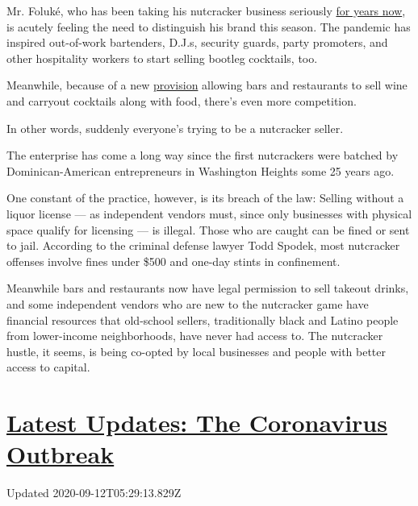 Mr. Foluké, who has been taking his nutcracker business seriously
\href{https://www.nytimes3xbfgragh.onion/2019/08/17/nyregion/banned-on-the-beach-its-still-nutcracker-summer.html}{for
years now}, is acutely feeling the need to distinguish his brand this
season. The pandemic has inspired out-of-work bartenders, D.J.s,
security guards, party promoters, and other hospitality workers to start
selling bootleg cocktails, too.

Meanwhile, because of a new
\href{https://sla.ny.gov/Restrictions-in-Response-to-COVID-19}{provision}
allowing bars and restaurants to sell wine and carryout cocktails along
with food, there's even more competition.

In other words, suddenly everyone's trying to be a nutcracker seller.

The enterprise has come a long way since the first nutcrackers were
batched by Dominican-American entrepreneurs in Washington Heights some
25 years ago.

One constant of the practice, however, is its breach of the law: Selling
without a liquor license --- as independent vendors must, since only
businesses with physical space qualify for licensing --- is illegal.
Those who are caught can be fined or sent to jail. According to the
criminal defense lawyer Todd Spodek, most nutcracker offenses involve
fines under \$500 and one-day stints in confinement.

Meanwhile bars and restaurants now have legal permission to sell takeout
drinks, and some independent vendors who are new to the nutcracker game
have financial resources that old-school sellers, traditionally black
and Latino people from lower-income neighborhoods, have never had access
to. The nutcracker hustle, it seems, is being co-opted by local
businesses and people with better access to capital.

\hypertarget{latest-updates-the-coronavirus-outbreak}{%
\section{\texorpdfstring{\href{https://www.nytimes3xbfgragh.onion/2020/09/11/world/covid-19-coronavirus.html?action=click\&pgtype=Article\&state=default\&region=MAIN_CONTENT_1\&context=storylines_live_updates}{Latest
Updates: The Coronavirus
Outbreak}}{Latest Updates: The Coronavirus Outbreak}}\label{latest-updates-the-coronavirus-outbreak}}

Updated 2020-09-12T05:29:13.829Z

